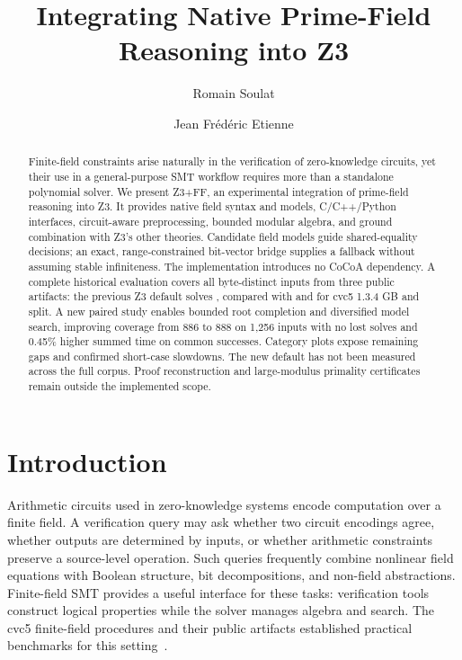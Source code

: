 \documentclass[runningheads]{llncs}
\newcommand{\tool}{Z3+FF}
\begin{document}
\title{Integrating Native Prime-Field Reasoning into Z3}
\author{Romain Soulat \and Jean Frédéric Etienne}
\maketitle
\begin{abstract}
Finite-field constraints arise naturally in the verification of zero-knowledge
circuits, yet their use in a general-purpose SMT workflow requires more than a
standalone polynomial solver. We present \tool{}, an experimental integration
of prime-field reasoning into Z3. It provides native field syntax and models,
C/C++/Python interfaces, circuit-aware preprocessing, bounded modular algebra,
and ground combination with Z3's other theories. Candidate field models guide
shared-equality decisions; an exact, range-constrained bit-vector bridge supplies
a fallback without assuming stable infiniteness. The implementation introduces
no CoCoA dependency. A complete historical evaluation covers all \CorpusN{}
byte-distinct inputs from three public artifacts: the previous Z3 default solves
\ZthreeSolved{}, compared with \CvcSolved{} and \SplitSolved{} for cvc5 1.3.4
GB and split. A new paired study enables bounded root completion and diversified
model search, improving coverage from 886 to 888 on 1,256 inputs with no lost
solves and 0.45\% higher summed time on common successes. Category plots expose
remaining gaps and confirmed short-case slowdowns. The new default has not been
measured across the full corpus. Proof reconstruction and large-modulus
primality certificates remain outside the implemented scope.
\end{abstract}

\section{Introduction}

Arithmetic circuits used in zero-knowledge systems encode computation over a
finite field. A verification query may ask whether two circuit encodings agree,
whether outputs are determined by inputs, or whether arithmetic constraints
preserve a source-level operation. Such queries frequently combine nonlinear
field equations with Boolean structure, bit decompositions, and non-field
abstractions. Finite-field SMT provides a useful interface for these tasks:
verification tools construct logical properties while the solver manages
algebra and search. The cvc5 finite-field procedures and their public artifacts
established practical benchmarks for this setting~\cite{ff23,split24}.
\end{document}
